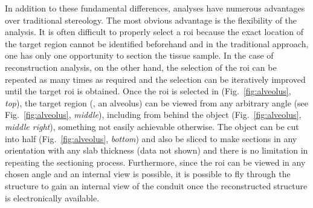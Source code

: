 In addition to these fundamental differences, \threed analyses have numerous advantages over traditional stereology. The most obvious advantage is the flexibility of the analysis. It is often difficult to properly select a \ac{roi} because the exact location of the target region cannot be identified beforehand and in the traditional approach, one has only one opportunity to section the tissue sample. In the case of \threed reconstruction analysis, on the other hand, the selection of the \ac{roi} can be repeated as many times as required and the selection can be iteratively improved until the target \ac{roi} is obtained. Once the \ac{roi} is selected in \threed (Fig.~\ref{fig:alveolus}, \textit{top}), the target region (\eg, an alveolus) can be viewed from any arbitrary angle (see Fig.~\ref{fig:alveolus}, \textit{middle}), including from behind the object (Fig.~\ref{fig:alveolus}, \textit{middle right}), something not easily achievable otherwise. The \threed object can be cut into half (Fig.~\ref{fig:alveolus}, \textit{bottom}) and also be sliced to make \twod sections in any orientation with any slab thickness (data not shown) and there is no limitation in repeating the sectioning process. Furthermore, since the \ac{roi} can be viewed in any chosen angle and an internal view is possible, it is possible to fly through the structure to gain an internal view of the conduit once the \threed reconstructed structure is electronically available.

